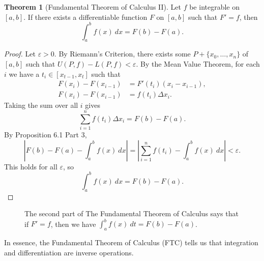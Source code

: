 \documentclass{article}
\newcommand{\R}{\mathbb{R}}
\theoremstyle{definition}
\newtheorem{theorem}{Theorem}[section]
\begin{document}
\begin{theorem}[Fundamental Theorem of Calculus II]
	Let $ f $ be integrable on $ [a,b] $. If there exists a differentiable function $ F $ on $ [a,b] $ such that $ F'=f $, then $$ \int_{a}^{b}f(x)\ dx=F(b)-F(a).$$
\end{theorem}
\begin{proof}
Let $ \varepsilon>0 $. By Riemann's Criterion, there exists some $ P+\{x_0,\ldots,x_n\} $ of $ [a,b] $ such that $ U(P,f)-L(P,f)<\varepsilon $. By the Mean Value Theorem, for each $ i $ we have a $ t_i\in[x_{t-1},x_t] $ such that \begin{align*}
	F(x_i)-F(x_{i-1})&=F'(t_i)(x_i-x_{i-1}),\\
	F(x_i)-F(x_{i-1})&=f(t_i)\Delta x_i.
\end{align*}
Taking the sum over all $ i $ gives $$\sum_{i=1}^{n}f(t_i)\Delta x_i=F(b)-F(a) .$$ By Proposition 6.1 Part 3, $$\left\lvert F(b)-F(a)-\int_{a}^{b}f(x)\ dx\right\rvert=\left\lvert\sum_{i=1}^{n}f(t_i)-\int_{a}^{b}f(x)\ dx\right\rvert<\varepsilon. $$ 
This holds for all $ \varepsilon $, so $$\int_{a}^{b}f(x)\ dx=F(b)-F(a). $$
\end{proof}
\begin{figure}[h!]
	\centering
	\caption{The second part of The Fundamental Theorem of Calculus says that if $ F'=f $, then we have $ \int_{a}^{b}f(x)\ dt=F(b)-F(a) $.}
\end{figure}
In essence, the Fundamental Theorem of Calculus (FTC) tells us that integration and differentiation are inverse operations.
\end{document}
